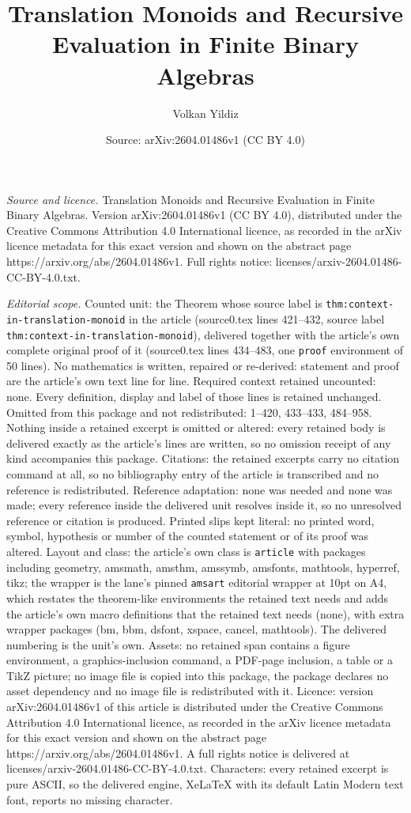 \documentclass[10pt,a4paper]{amsart}
\title[Translation Monoids and Recursive Evaluation in Finite Binar]{Translation Monoids and Recursive Evaluation in Finite Binary Algebras}
\author{Volkan Yildiz}
\date{Source: arXiv:2604.01486v1 (CC BY 4.0)}
\begin{document}
\maketitle

\noindent\emph{Source and licence.} Translation Monoids and Recursive Evaluation in Finite Binary Algebras. Version arXiv:2604.01486v1 (CC BY 4.0), distributed under the Creative Commons Attribution 4.0 International licence, as recorded in the arXiv licence metadata for this exact version and shown on the abstract page https://arxiv.org/abs/2604.01486v1. Full rights notice: licenses/arxiv-2604.01486-CC-BY-4.0.txt.\par\smallskip

\noindent\textit{Editorial scope.} Counted unit: the Theorem whose source label is \texttt{thm:context-in-translation-monoid} in the article (source0.tex lines 421--432, source label \texttt{thm:context-in-translation-monoid}), delivered together with the article's own complete original proof of it (source0.tex lines 434--483, one \texttt{proof} environment of 50 lines). No mathematics is written, repaired or re-derived: statement and proof are the article's own text line for line. Required context retained uncounted: none. Every definition, display and label of those lines is retained unchanged. Omitted from this package and not redistributed: 1--420, 433--433, 484--958. Nothing inside a retained excerpt is omitted or altered: every retained body is delivered exactly as the article's lines are written, so no omission receipt of any kind accompanies this package. Citations: the retained excerpts carry no citation command at all, so no bibliography entry of the article is transcribed and no reference is redistributed. Reference adaptation: none was needed and none was made; every reference inside the delivered unit resolves inside it, so no unresolved reference or citation is produced. Printed slips kept literal: no printed word, symbol, hypothesis or number of the counted statement or of its proof was altered. Layout and class: the article's own class is \texttt{article} with packages including geometry, amsmath, amsthm, amssymb, amsfonts, mathtools, hyperref, tikz; the wrapper is the lane's pinned \texttt{amsart} editorial wrapper at 10pt on A4, which restates the theorem-like environments the retained text needs and adds the article's own macro definitions that the retained text needs (none), with extra wrapper packages (bm, bbm, dsfont, xspace, cancel, mathtools). The delivered numbering is the unit's own. Assets: no retained span contains a figure environment, a graphics-inclusion command, a PDF-page inclusion, a table or a TikZ picture; no image file is copied into this package, the package declares no asset dependency and no image file is redistributed with it. Licence: version arXiv:2604.01486v1 of this article is distributed under the Creative Commons Attribution 4.0 International licence, as recorded in the arXiv licence metadata for this exact version and shown on the abstract page https://arxiv.org/abs/2604.01486v1. A full rights notice is delivered at licenses/arxiv-2604.01486-CC-BY-4.0.txt. Characters: every retained excerpt is pure ASCII, so the delivered engine, XeLaTeX with its default Latin Modern text font, reports no missing character.
\end{document}
